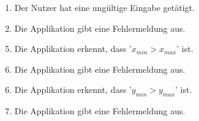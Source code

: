 \begin{itemize}
    \begin{enumerate}[label=(4a\arabic*)]
      \item Der Nutzer hat eine ung\"ultige Eingabe get\"atigt.
      \item Die Applikation gibt eine Fehlermeldung aus.
      \end{enumerate}
                      \begin{enumerate}[label=(5a\arabic*)]
    \setcounter{enumii}{4}
    \item Die Applikation erkennt, dass  '$ x_{min} > x_{max}$'  ist.
      \item Die Applikation gibt eine Fehlermeldung aus.
      \end{enumerate}
           \begin{enumerate}[label=(6a\arabic*)]
     \setcounter{enumii}{5}
    \item Die Applikation erkennt, dass  '$ y_{min} > y_{max}$'  ist.
    \item Die Applikation gibt eine Fehlermeldung aus.
      \end{enumerate}
  \end{itemize}

